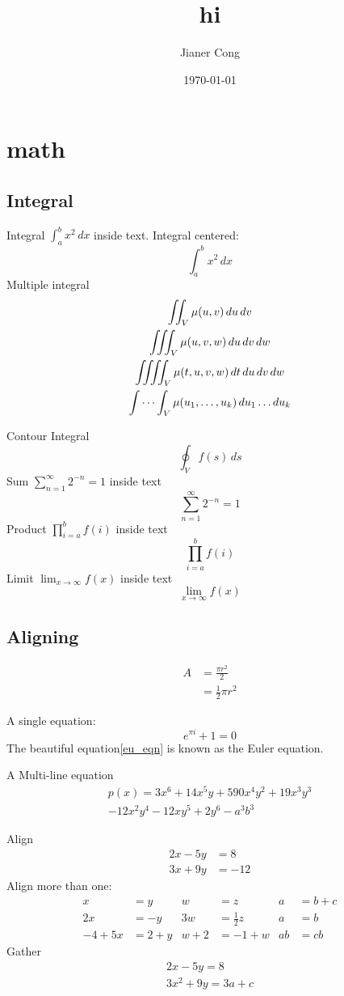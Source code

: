 \documentclass{article}
\title{hi}
\author{Jianer Cong}
\date{\today}
\begin{document}
\maketitle
\section{math}

\subsection{Integral}\label{sec:int}
Integral \(\int_{a}^{b} x^2 \,dx\) inside text.
Integral centered:
\[ \int_{a}^{b} x^2 \,dx \]
Multiple integral
\begin{gather*}
  \iint_V \mu(u,v) \,du\,dv
  \\
  \iiint_V \mu(u,v,w) \,du\,dv\,dw
  \\
  \iiiint_V \mu(t,u,v,w) \,dt\,du\,dv\,dw
  \\
  \idotsint_V \mu(u_1,\dots,u_k) \,du_1 \dots du_k
\end{gather*}

Contour Integral
\[
  \oint_V f(s) \,ds
\]
Sum $\sum_{n=1}^{\infty} 2^{-n} = 1$ inside text
\[ \sum_{n=1}^{\infty} 2^{-n} = 1 \]
Product $\prod_{i=a}^{b} f(i)$ inside text
\[ \prod_{i=a}^{b} f(i) \]
Limit $\lim_{x\to\infty} f(x)$ inside text
\[ \lim_{x\to\infty} f(x) \]

\subsection{Aligning}\label{sec:ali}%
\begin{equation} \label{eq1}
  \begin{split}
    A & = \frac{\pi r^2}{2} \\
    & = \frac{1}{2} \pi r^2
  \end{split}
\end{equation}

A single equation:
\begin{equation} \label{eu_eqn}
  e^{\pi i} + 1 = 0
\end{equation}
The beautiful equation\ref{eu_eqn} is known as the Euler equation.

A Multi-line equation
\begin{multline*}
  p(x) = 3x^6 + 14x^5y + 590x^4y^2 + 19x^3y^3\\ 
  - 12x^2y^4 - 12xy^5 + 2y^6 - a^3b^3
\end{multline*}

Align
\begin{align*} 
  2x - 5y &=  8 \\ 
  3x + 9y &=  -12
\end{align*}
Align more than one:
\begin{align*}
  x&=y           &  w &=z              &  a&=b+c\\
  2x&=-y         &  3w&=\frac{1}{2}z   &  a&=b\\
  -4 + 5x&=2+y   &  w+2&=-1+w          &  ab&=cb
\end{align*}
Gather
\begin{gather*} 
  2x - 5y =  8 \\ 
  3x^2 + 9y =  3a + c
\end{gather*}
\end{document}
